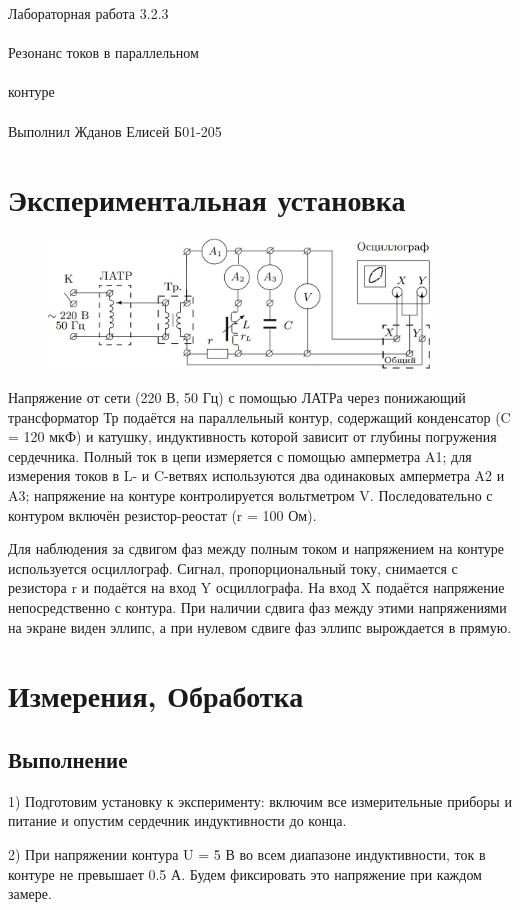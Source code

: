 \documentclass{astroedu-lab}
\begin{document}
\begin{problem}{\huge Лабораторная работа 3.2.3\\\\Резонанс токов в параллельном\\\\контуре\\\\Выполнил Жданов Елисей Б01-205}
\section{Экспериментальная установка}

\begin{figure}[!h]
	\centering
	\includegraphics[width=0.9\textwidth]{установка.png}
	\label{fig:boiler}
\end{figure}

Напряжение от сети (220 В, 50 Гц) с помощью ЛАТРа через понижающий трансформатор Тр подаётся на параллельный
контур, содержащий конденсатор (C = 120 мкФ) и катушку, индуктивность которой зависит от глубины погружения сердечника. Полный ток в цепи измеряется с помощью амперметра A1; для измерения токов в L- и C-ветвях используются два одинаковых амперметра A2 и A3; напряжение на контуре контролируется вольтметром V. Последовательно с контуром включён резистор-реостат (r = 100 Ом).


Для наблюдения за сдвигом фаз между полным током и напряжением
на контуре используется осциллограф. Сигнал, пропорциональный току, снимается с резистора r и подаётся на вход Y осциллографа. На вход X подаётся напряжение непосредственно с контура. При наличии сдвига фаз между этими напряжениями на экране виден эллипс, а при нулевом сдвиге фаз эллипс вырождается в прямую.

\newpage

\section{Измерения, Обработка}

\subsection{Выполнение}

1) Подготовим установку к эксперименту: включим все измерительные приборы и питание и опустим сердечник индуктивности до конца.

2) При напряжении контура U = 5 В во всем диапазоне индуктивности, ток в контуре не превышает 0.5 А. Будем фиксировать это напряжение при каждом замере.


\end{problem}
\end{document}
